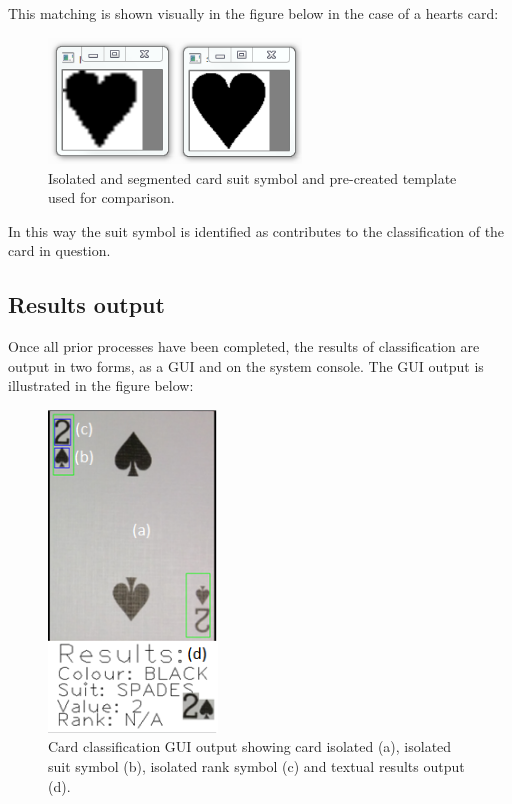 \documentclass[a4paper,12pt,notitlepage]{article}
\begin{document}
		This matching is shown visually in the figure below in the case of a hearts card:

		\begin{figure}[H]
			\centering
			\includegraphics[width=0.6\textwidth]{chris/image32}
			\caption{Isolated and segmented card suit symbol and pre-created template used for comparison.}
		\end{figure}

		In this way the suit symbol is identified as contributes to the classification of the card in question.

	\subsection{Results output}
		Once all prior processes have been completed, the results of classification are output in two forms, as a GUI and on the system console. The GUI output is illustrated in the figure below:
		
		\begin{figure}[H]
			\centering
			\includegraphics[width=0.4\textwidth]{chris/image33}
			\caption{Card classification GUI output showing card isolated (a), isolated suit symbol (b), isolated rank symbol (c) and textual results output (d).}
		\end{figure}
\end{document}
